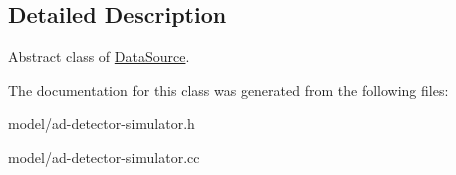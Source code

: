 \subsection{Detailed Description}
Abstract class of \hyperlink{classns3_1_1DataSource}{Data\+Source}. 

The documentation for this class was generated from the following files\+:\begin{DoxyCompactItemize}
\item 
model/ad-\/detector-\/simulator.\+h\item 
model/ad-\/detector-\/simulator.\+cc\end{DoxyCompactItemize}
